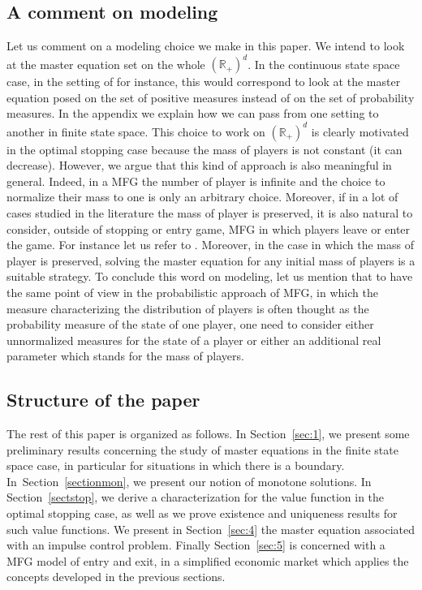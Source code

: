 \documentclass[10pt]{amsart}
\theoremstyle{definition}
\begin{document}
\subsection*{A comment on modeling}
Let us comment on a modeling choice we make in this paper. We intend to look at the master equation set on the whole $(\mathbb{R}_+)^d$. In the continuous state space case, in the setting of \cite{cardaliaguet2019master} for instance, this would correspond to look at the master equation posed on the set of positive measures instead of on the set of probability measures. In the appendix we explain how we can pass from one setting to another in finite state space. This choice to work on $(\mathbb{R}_+)^d$ is clearly motivated in the optimal stopping case because the mass of players is not constant (it can decrease). However, we argue that this kind of approach is also meaningful in general. Indeed, in a MFG the number of player is infinite and the choice to normalize their mass to one is only an arbitrary choice. Moreover, if in a lot of cases studied in the literature the mass of player is preserved, it is also natural to consider, outside of stopping or entry game, MFG in which players leave or enter the game. For instance let us refer to \cite{claisse2019mean}. Moreover, in the case in which the mass of player is preserved, solving the master equation for any initial mass of players is a suitable strategy. To conclude this word on modeling, let us mention that to have the same point of view in the probabilistic approach of MFG, in which the measure characterizing the distribution of players is often thought as the probability measure of the state of one player, one need to consider either unnormalized measures for the state of a player or either an additional real parameter which stands for the mass of players.

\subsection*{Structure of the paper}
The rest of this paper is organized as follows. In Section~\ref{sec:1}, we present some preliminary results concerning the study of master equations in the finite state space case, in particular for situations in which there is a boundary. In~Section~\ref{sectionmon}, we present our notion of monotone solutions. In Section~\ref{sectstop}, we derive a characterization for the value function in the optimal stopping case, as well as we prove existence and uniqueness results for such value functions. We present in Section~\ref{sec:4} the master equation associated with an impulse control problem. Finally Section~\ref{sec:5} is concerned with a MFG model of entry and exit, in a simplified economic market which applies the concepts developed in the previous sections.
\end{document}
